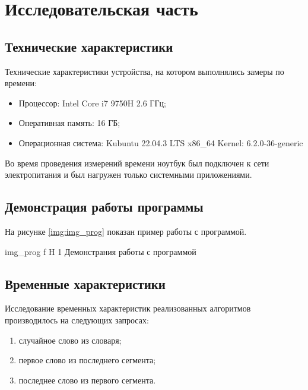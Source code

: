\chapter{Исследовательская часть}

\section{Технические характеристики}
Технические характеристики устройства, на котором выполнялись
замеры по времени:

\begin{itemize}
    \item Процессор: Intel Core i7 9750H 2.6 ГГц;
    \item Оперативная память: 16 ГБ;
    \item Операционная система: Kubuntu 22.04.3 LTS x86\_64 Kernel: 6.2.0-36-generic
\end{itemize}

Во время проведения измерений времени ноутбук был подключен к сети электропитания и был нагружен только системными приложениями.

\section{Демонстрация работы программы}

На рисунке \ref{img:img_prog} показан пример работы с программой.


    {img_prog} %
    {f} %
    {H} %
    {1\textwidth} %
    {Демонстрания работы с программой} %


\clearpage

\section{Временные характеристики}

Исследование временных характеристик реализованных алгоритмов производилось на следующих запросах:
\begin{enumerate}
    \item случайное слово из словаря;
    \item первое слово из последнего сегмента;
    \item последнее слово из первого сегмента.
\end{enumerate}

